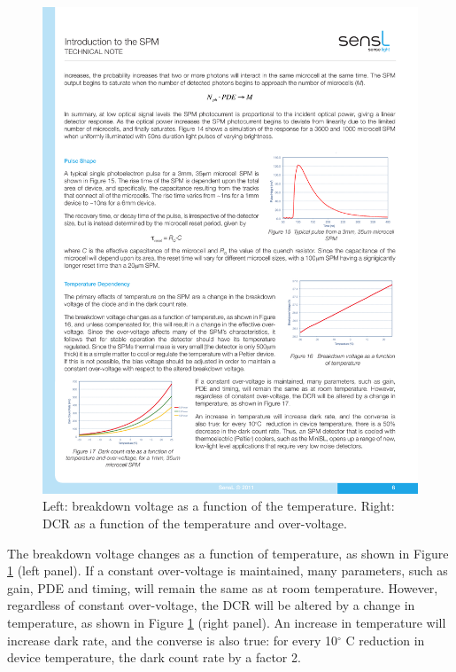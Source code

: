 \begin{figure}[!bhtp]
	\includegraphics[scale=0.9]{img/DCRTdep.pdf}
	\caption{\label{fig.temp} Left: breakdown voltage as a function of the temperature. Right: DCR as a function of the temperature and over-voltage.}
\end{figure}


The breakdown voltage changes as a function of temperature, as shown in Figure \ref{fig.temp} (left panel). If a constant over-voltage is maintained, many parameters, such as gain, PDE and timing, will remain the same as at room temperature. However, regardless of constant over-voltage, the DCR will be altered by a change in temperature, as shown in Figure \ref{fig.temp} (right panel). An increase in temperature will increase dark rate, and the converse is also true: for every 10$^\circ$ C reduction in device temperature, the dark count rate by a factor 2. 

